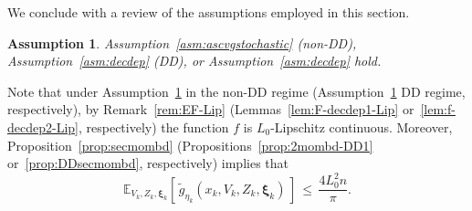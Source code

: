 \documentclass[11pt,reqno]{amsart}
\newcommand{\1}{{\bf 1}}
\newcommand{\2}{{\bf 2}}
\newcommand{\pc}[1]{{\color{cyan}#1}}
\newcommand{\bxi}{\boldsymbol{\xi}}
\numberwithin{equation}{section}
\newtheorem{assumption}{Assumption}[section]
\theoremstyle{remark}
\begin{document}
{	\medskip
	
	We conclude with a review of the  assumptions employed in this section.
	\begin{assumption}\label{asm:non-convex} Assumption~\ref{asm:ascvgstochastic} (non-DD), Assumption~\ref{asm:decdep} (DD), or Assumption~\ref{asm:decdep} hold. 
	\end{assumption}
	Note that under Assumption~\ref{asm:non-convex} in the non-DD regime (Assumption~\ref{asm:non-convex} DD regime, respectively), by Remark~\ref{rem:EF-Lip} (Lemmas~\ref{lem:F-decdep1-Lip} or~\ref{lem:f-decdep2-Lip}, respectively) the function $f$ is $L_0$-Lipschitz continuous. Moreover, Proposition~\ref{prop:secmombd} (Propositions~\ref{prop:2mombd-DD1} or~\ref{prop:DDsecmombd}, respectively) implies that
	\begin{equation*}
		\mathbb{E}_{V_k, Z_k, \bxi_k} \left[\, \tilde{g}_{\eta_k}(x_k, V_k, Z_k, \bxi_k)\, \right] \, \leq \, \frac{4L_0^2 n}{\pi}.
	\end{equation*}
	
	
	
}
\end{document}
